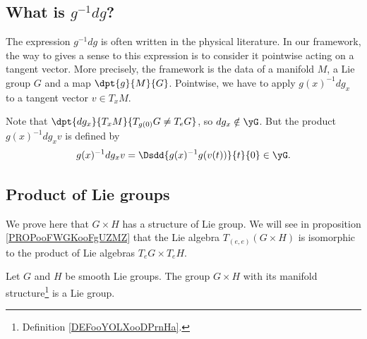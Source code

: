 \subsection{What is  \texorpdfstring{$g^{-1} dg$}{g-1dg}?}\label{SubSecgmudg}

The expression $g^{-1} dg$ is often written in the physical literature. In our framework, the way to gives a sense to this expression is to consider it pointwise acting on a tangent vector. More precisely, the framework is the data of a manifold $M$, a Lie group $G$ and a map $\dpt{g}{M}{G}$. Pointwise, we have to apply $g(x)^{-1} dg_x$ to a tangent vector $v\in T_xM$.

Note that $\dpt{dg_x}{T_xM}{T_{g(0)}G\neq T_eG}$, so $dg_x\notin \yG$. But the product $g(x)^{-1} dg_x v$ is defined by
\begin{equation}
	g(x)^{-1} dg_x v=\Dsdd{ g(x)^{-1} g(v(t)) }{t}{0}\in\yG.
\end{equation}


\subsection{Product of Lie groups}


We prove here that \( G\times H\) has a structure of Lie group. We will see in proposition \ref{PROPooFWGKooFgUZMZ} that the Lie algebra \( T_{(e,e)}(G\times H)\) is isomorphic to the product of Lie algebras \( T_eG\times T_eH\).
\begin{proposition}	  \label{PROPooKITOooTcsIiu}
	Let \( G\) and \( H \) be smooth Lie groups. The group \( G\times H\) with its manifold structure\footnote{Definition \ref{DEFooYOLXooDPrnHa}.} is a Lie group.
\end{proposition}


